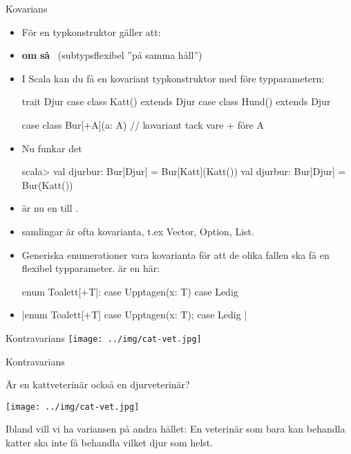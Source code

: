 \begin{Slide}{Kovarians }
\begin{itemize}\SlideFontSmall
\item För en  typkonstruktor  gäller att: 
\item[] \textbf{om}  \textbf{så} ~(subtypsflexibel ''på samma håll'')
\item I Scala kan du få en kovariant typkonstruktor med \code{+} före typparametern:
\begin{Code}
trait Djur
case class Katt() extends Djur
case class Hund() extends Djur

case class Bur[+A](a: A)  // kovariant tack vare + före A
\end{Code}
\pause
\item Nu funkar det \code{:)}
\begin{REPL}
scala> val djurbur: Bur[Djur] = Bur[Katt](Katt())
val djurbur: Bur[Djur] = Bur(Katt())
\end{REPL}
\item {} är nu en  till .
\pause
\item {} samlingar är ofta kovarianta, t.ex Vector, Option, List.
\pause
\item Generiska enumerationer  vara kovarianta för att de olika fallen ska få en flexibel typparameter.  är en  här:
\ifkompendium
\begin{Code}
enum Toalett[+T]:
  case Upptagen(x: T)
  case Ledig
\end{Code}
\else
\item[] \code|enum Toalett[+T] { case Upptagen(x: T); case Ledig }|
\fi 
\end{itemize}

\end{Slide}


\ifkompendium\else
\begin{SlideSimple}{Kontravarians}
\hspace*{-1cm}\texttt{[image: ../img/cat-vet.jpg]}  
\end{SlideSimple}
\fi 

\begin{Slide}{Kontravarians}
\begin{center}
Är en kattveterinär också en djurveterinär?

\texttt{[image: ../img/cat-vet.jpg]}  

Ibland vill vi ha variansen på andra hållet: En veterinär som bara kan behandla katter ska inte få behandla vilket djur som helst.
\end{center}
\end{Slide}

